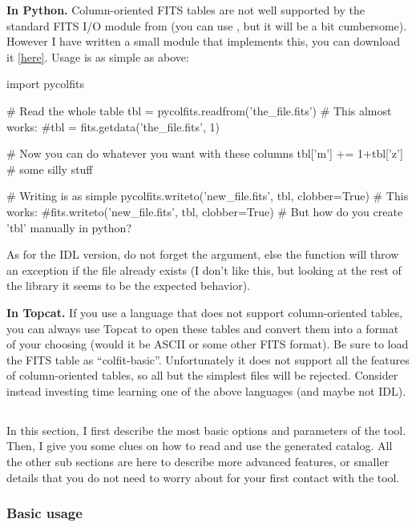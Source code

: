\documentclass[12pt,a4paper]{article}
\begin{document}
{\bf In Python.} Column-oriented FITS tables are not well supported by the standard FITS I/O module from  (you can use , but it will be a bit cumbersome). However I have written a small module that implements this, you can download it \href{https://github.com/cschreib/phypp/blob/master/python/pycolfits.py}{[here]}. Usage is as simple as above:
\begin{pythoncode}
import pycolfits

# Read the whole table
tbl = pycolfits.readfrom('the_file.fits')
# This almost works:
#tbl = fits.getdata('the_file.fits', 1)

# Now you can do whatever you want with these columns
tbl['m'] += 1+tbl['z'] # some silly stuff

# Writing is as simple
pycolfits.writeto('new_file.fits', tbl, clobber=True)
# This works:
#fits.writeto('new_file.fits', tbl, clobber=True)
# But how do you create 'tbl' manually in python?
\end{pythoncode}
As for the IDL version, do not forget the  argument, else the function will throw an exception if the file already exists (I don't like this, but looking at the rest of the  library it seems to be the expected behavior).

{\bf In Topcat.} If you use a language that does not support column-oriented tables, you can always use Topcat to open these tables and convert them into a format of your choosing (would it be ASCII or some other FITS format). Be sure to load the FITS table as ``colfit-basic''. Unfortunately it does not support all the features of column-oriented tables, so all but the simplest files will be rejected. Consider instead investing time learning one of the above languages (and maybe not IDL).


\subsection{}

In this section, I first describe the most basic options and parameters of the tool. Then, I give you some clues on how to read and use the generated catalog. All the other sub sections are here to describe more advanced features, or smaller details that you do not need to worry about for your first contact with the tool.

\subsubsection{Basic usage}
\end{document}

